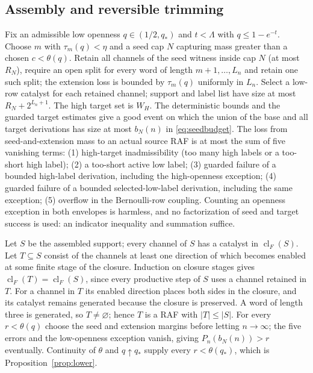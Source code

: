 \documentclass[11pt,letterpaper]{article}
\theoremstyle{plain}
\theoremstyle{definition}
\theoremstyle{remark}
\numberwithin{equation}{section}
\newcommand{\cl}{\operatorname{cl}}
\newcommand{\thetaq}{\theta(q_*)}
\begin{document}
\subsection{Assembly and reversible trimming}\label{app:assembly}
Fix an admissible low openness $q\in(1/2,q_*)$ and $t<\Lambda$ with $q\le1-e^{-t}$. Choose $m$ with $\tau_m(q)<\eta$ and a seed cap $N$ capturing mass greater than a chosen $c<\theta(q)$. Retain all channels of the seed witness inside cap $N$ (at most $R_N$), require an open split for every word of length $m+1,\dots,L_n$ and retain one such split; the extension loss is bounded by $\tau_m(q)$ uniformly in $L_n$. Select a low-row catalyst for each retained channel; support and label list have size at most $R_N+2^{L_n+1}$. The high target set is $W_H$. The deterministic bounds and the guarded target estimates give a good event on which the union of the base and all target derivations has size at most $b_N(n)$ in \eqref{eq:seedbudget}. The loss from seed-and-extension mass to an actual source RAF is at most the sum of five vanishing terms: (1) high-target inadmissibility (too many high labels or a too-short high label); (2) a too-short active low label; (3) guarded failure of a bounded high-label derivation, including the high-openness exception; (4) guarded failure of a bounded selected-low-label derivation, including the same exception; (5) overflow in the Bernoulli-row coupling. Counting an openness exception in both envelopes is harmless, and no factorization of seed and target success is used: an indicator inequality and summation suffice.

Let $S$ be the assembled support; every channel of $S$ has a catalyst in $\cl_F(S)$. Let $T\subseteq S$ consist of the channels at least one direction of which becomes enabled at some finite stage of the closure. Induction on closure stages gives $\cl_F(T)=\cl_F(S)$, since every productive step of $S$ uses a channel retained in $T$. For a channel in $T$ its enabled direction places both sides in the closure, and its catalyst remains generated because the closure is preserved. A word of length three is generated, so $T\ne\varnothing$; hence $T$ is a RAF with $|T|\le|S|$. For every $r<\theta(q)$ choose the seed and extension margins before letting $n\to\infty$; the five errors and the low-openness exception vanish, giving $P_n(b_N(n))>r$ eventually. Continuity of $\theta$ and $q\uparrow q_*$ supply every $r<\thetaq$, which is Proposition~\ref{prop:lower}.
\end{document}
